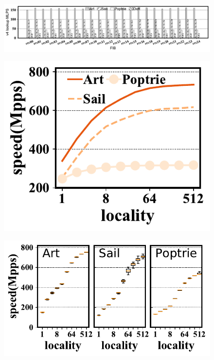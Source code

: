\documentclass[a4paper]{article}
\begin{document}
    \begin{figure}[tbp]
        \includegraphics{../exp/pic/exp1-v4.pdf}
    \end{figure}
    \begin{figure}[tbp]
        \includegraphics{../result/example-pdf/example1.pdf}
    \end{figure}

    \begin{figure}[htbp]
        \includegraphics{../result/example-pdf/example2.pdf}
    \end{figure}
\end{document}

